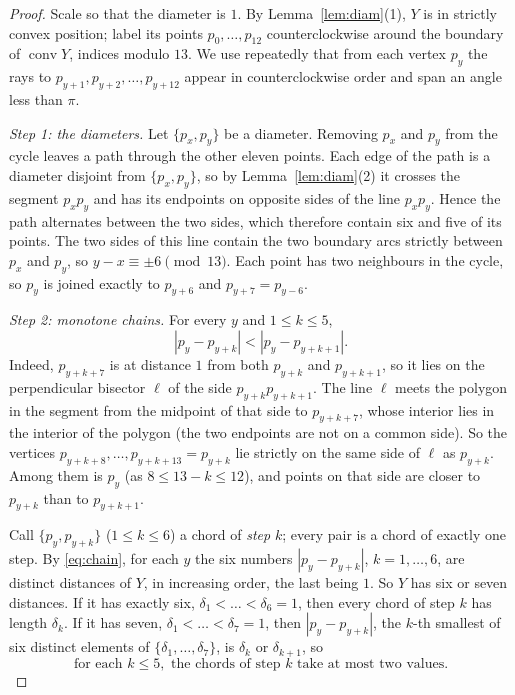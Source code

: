\documentclass[11pt]{amsart}
\theoremstyle{definition}
\theoremstyle{remark}
\newcommand{\conv}{\operatorname{conv}}
\begin{document}
\begin{proof}
Scale so that the diameter is $1$. By Lemma~\ref{lem:diam}(1), $Y$ is in strictly convex position; label
its points $p_0,\dots,p_{12}$ counterclockwise around the boundary of $\conv Y$, indices modulo $13$. We use
repeatedly that from each vertex $p_y$ the rays to $p_{y+1},p_{y+2},\dots,p_{y+12}$ appear in
counterclockwise order and span an angle less than $\pi$.

\emph{Step 1: the diameters.} Let $\{p_x,p_y\}$ be a diameter. Removing $p_x$ and $p_y$ from the cycle leaves
a path through the other eleven points. Each edge of the path is a diameter disjoint from $\{p_x,p_y\}$, so
by Lemma~\ref{lem:diam}(2) it crosses the segment $p_xp_y$ and has its endpoints on opposite sides of the
line $p_xp_y$. Hence the path alternates between the two sides, which therefore contain six and five of
its points. The two sides of this line contain the two boundary arcs strictly between $p_x$ and $p_y$, so
$y-x\equiv\pm6\pmod{13}$. Each point has two neighbours in the cycle, so $p_y$ is joined exactly to
$p_{y+6}$ and $p_{y+7}=p_{y-6}$.

\emph{Step 2: monotone chains.} For every $y$ and $1\le k\le5$,
\begin{equation}\label{eq:chain}
  |p_y-p_{y+k}|<|p_y-p_{y+k+1}|.
\end{equation}
Indeed, $p_{y+k+7}$ is at distance $1$ from both $p_{y+k}$ and $p_{y+k+1}$, so it lies on the perpendicular
bisector $\ell$ of the side $p_{y+k}p_{y+k+1}$. The line $\ell$ meets the polygon in the segment from the
midpoint of that side to $p_{y+k+7}$, whose interior lies in the interior of the polygon (the two endpoints
are not on a common side). So the vertices $p_{y+k+8},\dots,p_{y+k+13}=p_{y+k}$ lie strictly
on the same side of $\ell$ as $p_{y+k}$. Among them is $p_y$ (as $8\le13-k\le12$), and points on that side
are closer to $p_{y+k}$ than to $p_{y+k+1}$.

Call $\{p_y,p_{y+k}\}$ ($1\le k\le6$) a chord of \emph{step} $k$; every pair is a chord of exactly one step.
By \eqref{eq:chain}, for each $y$ the six numbers $|p_y-p_{y+k}|$, $k=1,\dots,6$, are distinct distances of
$Y$, in increasing order, the last being $1$. So $Y$ has six or seven distances. If it has exactly six, $\delta_1<\dots<\delta_6=1$,
then every chord of step $k$ has length $\delta_k$. If it has seven, $\delta_1<\dots<\delta_7=1$, then
$|p_y-p_{y+k}|$, the $k$-th smallest of six distinct elements of $\{\delta_1,\dots,\delta_7\}$, is
$\delta_k$ or $\delta_{k+1}$, so
\begin{equation}\label{eq:twovalues}
  \text{for each } k\le5, \text{ the chords of step } k \text{ take at most two values.}
\end{equation}


\end{proof}
\end{document}
